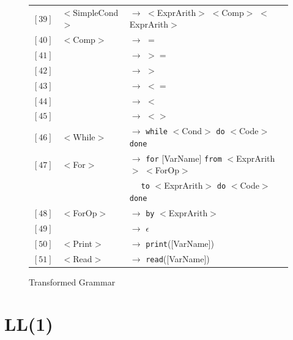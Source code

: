 \documentclass[letterpaper]{article}
\begin{document}
\begin{figure}[H]
\begin{center}
\begin{tabular}{r l l}
                $[39]$ & $<$SimpleCond$>$ & $\rightarrow$
                $<$ExprArith$>$ $<$Comp$>$ $<$ExprArith$>$ \\
                $[40]$ & $<$Comp$>$ & $\rightarrow$ $=$ \\
                $[41]$ & & $\rightarrow$ $>=$ \\
                $[42]$ & & $\rightarrow$ $>$ \\
                $[43]$ & & $\rightarrow$ $<=$ \\
                $[44]$ & & $\rightarrow$ $<$ \\
                $[45]$ & & $\rightarrow$ $<>$ \\

                $[46]$ & $<$While$>$ & $\rightarrow$
                \texttt{while} $<$Cond$>$ \texttt{do}
                $<$Code$>$ \texttt{done} \\
                $[47]$ & $<$For$>$ & $\rightarrow$
                \texttt{for} [VarName] \texttt{from}
                $<$ExprArith$>$ $<$ForOp$>$ \\
                & &
                $\quad$ \texttt{to} $<$ExprArith$>$
                \texttt{do} $<$Code$>$ \texttt{done} \\
                $[48]$ & $<$ForOp$>$ & $\rightarrow$
                \texttt{by} $<$ExprArith$>$ \\
                $[49]$ & & $\rightarrow$ $\epsilon$ \\
                $[50]$ & $<$Print$>$ & $\rightarrow$
                \texttt{print}([VarName]) \\
                $[51]$ & $<$Read$>$ & $\rightarrow$ \texttt{read}([VarName]) \\



            \end{tabular}

    \end{center}
    \caption{Transformed Grammar}
    \label{fig:fullcfg}
\end{figure}

\section{LL(1)}
\end{document}
